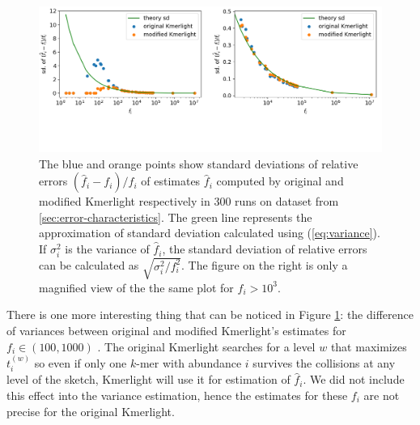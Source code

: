 \begin{figure}[h]
\centerline{\includegraphics[width=1\textwidth, trim={0cm, 3.1cm, 0cm, 0cm}, clip]{images/std_deviations_comparison_theory2.png}}
\caption[Experimental and theoretical variance of Kmerlight]{The blue and orange points show 
standard deviations of relative errors $(\hat f_i - f_i) / f_i$ of estimates $\hat f_i$
computed by original and modified Kmerlight respectively in 300 runs on dataset from 
\ref{sec:error-characteristics}. The green line represents the approximation of standard
deviation calculated using (\ref{eq:variance}). If $\sigma^2_i$ is the variance of $\hat f_i$,
the standard deviation of relative errors can be calculated as $\sqrt{\sigma_i^2 / f_i^2}$. 
The figure on the right is only a magnified view of the  the same plot for $f_i > 10^3$.}
\label{img:std-theory}
\end{figure}

There is one more interesting thing that can be noticed in Figure \ref{img:std-theory}:
the difference of variances between original and modified Kmerlight's estimates for 
$f_i \in (100, 1000)$ . The original Kmerlight searches for a level $w$ that maximizes $t_i^{(w)}$ so
even if only one $k$-mer with abundance $i$ survives the collisions at any level of the sketch, 
Kmerlight will use it for estimation of $\hat f_i$. We did not include this effect into the
variance estimation, hence the estimates for these $f_i$ are not precise for the original Kmerlight.
